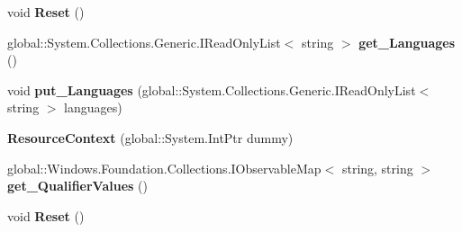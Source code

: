 \begin{DoxyCompactItemize}
\item 
\mbox{\label{class_windows_1_1_application_model_1_1_resources_1_1_core_1_1_resource_context_a8d2f7782f2b1b6983c33b2297f40b075}} 
void {\bfseries Reset} ()
\item 
\mbox{\label{class_windows_1_1_application_model_1_1_resources_1_1_core_1_1_resource_context_a56ecf1f243ff7d36fb0a7621f3016c07}} 
global\+::\+System.\+Collections.\+Generic.\+I\+Read\+Only\+List$<$ string $>$ {\bfseries get\+\_\+\+Languages} ()
\item 
\mbox{\label{class_windows_1_1_application_model_1_1_resources_1_1_core_1_1_resource_context_aeb5ce93158d04ebbec8c22b384409285}} 
void {\bfseries put\+\_\+\+Languages} (global\+::\+System.\+Collections.\+Generic.\+I\+Read\+Only\+List$<$ string $>$ languages)
\item 
\mbox{\label{class_windows_1_1_application_model_1_1_resources_1_1_core_1_1_resource_context_a718c064119f7ea5fd82856c6423dad71}} 
{\bfseries Resource\+Context} (global\+::\+System.\+Int\+Ptr dummy)
\item 
\mbox{\label{class_windows_1_1_application_model_1_1_resources_1_1_core_1_1_resource_context_ac228527597261c45581d0c380d6339bd}} 
global\+::\+Windows.\+Foundation.\+Collections.\+I\+Observable\+Map$<$ string, string $>$ {\bfseries get\+\_\+\+Qualifier\+Values} ()
\item 
\mbox{\label{class_windows_1_1_application_model_1_1_resources_1_1_core_1_1_resource_context_a8d2f7782f2b1b6983c33b2297f40b075}} 
void {\bfseries Reset} ()
\item 
\mbox{\label{class_windows_1_1_application_model_1_1_resources_1_1_core_1_1_resource_context_a56ecf1f243ff7d36fb0a7621f3016c07}} 

\end{DoxyCompactItemize}
